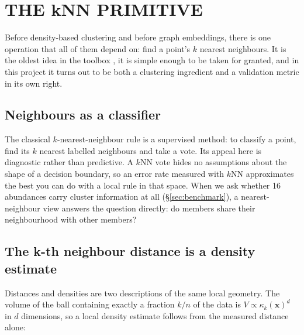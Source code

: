 \section{THE kNN PRIMITIVE}
\label{sec:knn}


Before density-based clustering and before graph embeddings, there is one
operation that all of them depend on: find a point's $k$ nearest neighbours.
It is the oldest idea in the toolbox \citep{Cover:67}, it is simple enough to
be taken for granted, and in this project it turns out to be both a
clustering ingredient and a validation metric in its own right.

\subsection{Neighbours as a classifier}

The classical $k$-nearest-neighbour rule is a supervised method: to classify a
point, find its $k$ nearest labelled neighbours and take a vote. Its appeal
here is diagnostic rather than predictive. A $k$NN vote hides no assumptions
about the shape of a decision boundary, so an error rate measured with $k$NN
approximates the best you can do with a local rule in that space. When we ask
whether 16 abundances carry cluster information at all
(\S\ref{sec:benchmark}), a nearest-neighbour view answers the question
directly: do members share their neighbourhood with other members?

\begin{marginnote}[]
\end{marginnote}

\subsection{The k-th neighbour distance is a density estimate}

Distances and densities are two descriptions of the same local geometry. The
volume of the ball containing exactly a fraction $k/n$ of the data is
$V \propto \kappa_k(\mathbf{x})^d$ in $d$ dimensions, so a local density
estimate follows from the measured distance alone:

